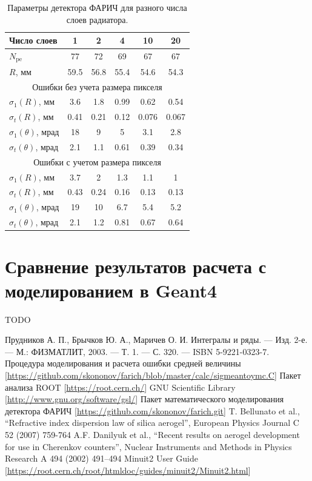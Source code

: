 \documentclass[12pt]{article}
\begin{document}
\begin{table}[htbp]
\caption{Параметры детектора ФАРИЧ для разного числа слоев радиатора.}
\label{tab:parlayers}
\begin{center}
\begin{tabular}{lccccc}\hline
Число слоев &  1 &  2 &  4 & 10 & 20\\\hline
$N_\mathrm{pe}$ &   77 &   72 &   69 &   67 &   67\\\hline
$R$, мм &  59.5 &  56.8 &  55.4 &  54.6 &  54.3\\\hline
\multicolumn{6}{c}{Ошибки без учета размера пикселя}\\\hline
$\sigma_1(R)$, мм &  3.6 &  1.8 & 0.99 & 0.62 & 0.54\\\hline
$\sigma_t(R)$, мм & 0.41 & 0.21 & 0.12 & 0.076 & 0.067\\\hline
$\sigma_1(\theta)$, мрад &   18 &    9 &    5 &  3.1 &  2.8\\\hline
$\sigma_t(\theta)$, мрад &  2.1 &  1.1 & 0.61 & 0.39 & 0.34\\\hline
\multicolumn{6}{c}{Ошибки с учетом размера пикселя}\\\hline
$\sigma_1(R)$, мм &  3.7 &    2 &  1.3 &  1.1 &    1\\\hline
$\sigma_t(R)$, мм & 0.43 & 0.24 & 0.16 & 0.13 & 0.13\\\hline
$\sigma_1(\theta)$, мрад &   19 &   10 &  6.7 &  5.4 &  5.2\\\hline
$\sigma_t(\theta)$, мрад &  2.1 &  1.2 & 0.81 & 0.67 & 0.64\\\hline
\end{tabular}
\end{center}
\end{table}


\section{Сравнение результатов расчета с моделированием в Geant4}
TODO

\begin{thebibliography}{99}
 Прудников А. П., Брычков Ю. А., Маричев О. И. Интегралы и ряды. — Изд. 2-е. — М.: ФИЗМАТЛИТ, 2003. — Т. 1. — С. 320. — ISBN 5-9221-0323-7.
 Процедура моделирования и расчета ошибки средней величины [\url{https://github.com/skononov/farich/blob/master/calc/sigmeantoymc.C}]
 Пакет анализа ROOT [\url{https://root.cern.ch/}]
 GNU Scientific Library [\url{http://www.gnu.org/software/gsl/}]
 Пакет математического моделирования детектора ФАРИЧ [\url{https://github.com/skononov/farich.git}]
 T. Bellunato et al., ``Refractive index dispersion law of silica aerogel'',
European Physics Journal C 52 (2007) 759-764
 A.F. Danilyuk et al., ``Recent results on aerogel development for use in Cherenkov counters'',
Nuclear Instruments and Methods in Physics Research A 494 (2002) 491–494
 Minuit2 User Guide [\url{https://root.cern.ch/root/htmldoc/guides/minuit2/Minuit2.html}]
\end{thebibliography}
\end{document}
